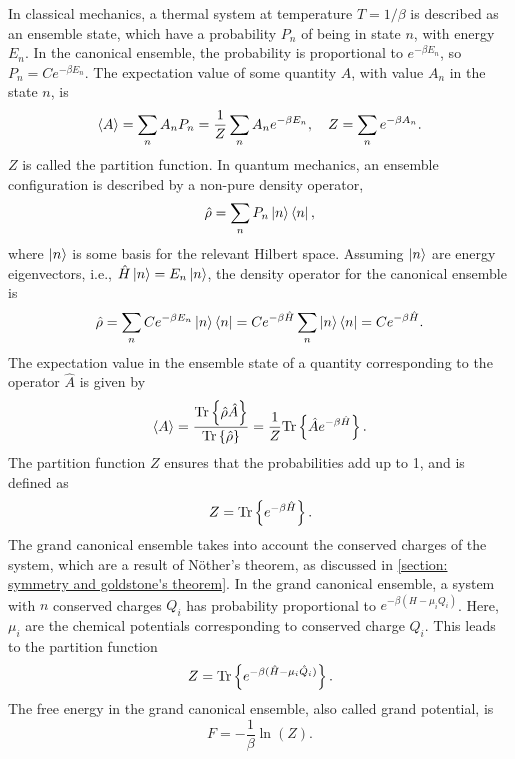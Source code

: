 In classical mechanics, a thermal system at temperature $T = 1 / \beta$ is described as an ensemble state, which have a probability $P_n$ of being in state $n$, with energy $E_n$.
In the canonical ensemble, the probability is proportional to $e^{-\beta E_n}$, so $P_n = C e^{-\beta E_n}$.
The expectation value of some quantity $A$, with value $A_n$ in the state $n$, is
%
\begin{equation}
    \left\langle A \right\rangle 
    = \sum_n A_n P_n = \frac{1}{Z} \sum_n A_n e^{- \beta E_n}, \quad 
    Z  = \sum_n e^{-\beta A_n}.
\end{equation}
$Z$ is called the partition function. In quantum mechanics, an ensemble configuration is described by a non-pure density operator,
%
\begin{equation}
    \hat \rho = \sum_n P_n \ket{n}\bra{n},
\end{equation}
where $\ket{n}$ is some basis for the relevant Hilbert space. Assuming $\ket{n}$ are energy eigenvectors, i.e., $\hat H \ket{n} = E_n \ket{n}$, the density operator for the canonical ensemble is
%
\begin{equation}
    \hat \rho 
    = \sum_n C e^{-\beta E_n} \ket{n}\bra{n} 
    = C e^{-\beta \hat H} \sum_n \ket{n}\bra{n} 
    = C e^{-\beta \hat H}.
\end{equation}
The expectation value in the ensemble state of a quantity corresponding to the operator $\hat A$ is given by
%
\begin{align}
    \left\langle A \right\rangle = \frac{ \text{Tr} \left\{ \hat \rho \hat A \right\} }{\text{Tr} \left\{ \hat \rho  \right\}}
    = \frac{1}{Z} \text{Tr} \left\{ \hat A e^{-\beta \hat H} \right\}.
\end{align}
%
The partition function $Z$ ensures that the probabilities add up to 1, and is defined as
%
\begin{equation}
    Z = \text{Tr} \left\{ e^{-\beta \hat H} \right\}.
\end{equation}
%
The grand canonical ensemble takes into account the conserved charges of the system, which are a result of Nöther's theorem, as discussed in 
\autoref{section: symmetry and goldstone's theorem}.
In the grand canonical ensemble, a system with $n$ conserved charges $Q_i$ has probability proportional to $e^{-\beta (H - \mu_i Q_i)}$.
Here, $\mu_i$ are the chemical potentials corresponding to conserved charge $Q_i$.
This leads to the partition function
%
\begin{equation}
    Z = \text{Tr} \left\{ e^{-\beta(\hat H - \mu_i \hat Q_i)} \right\}.
\end{equation}
%
The free energy in the grand canonical ensemble, also called grand potential, is
%
\begin{equation}
    F = -\frac{1}{\beta} \ln(Z).
\end{equation}


